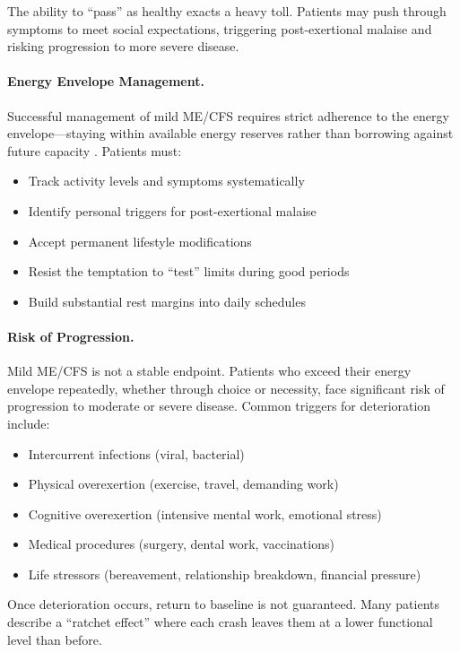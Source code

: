 The ability to ``pass'' as healthy exacts a heavy toll. Patients may push through symptoms to meet social expectations, triggering post-exertional malaise and risking progression to more severe disease.

\paragraph{Energy Envelope Management.}
Successful management of mild ME/CFS requires strict adherence to the energy envelope---staying within available energy reserves rather than borrowing against future capacity \cite{jason2012energy}. Patients must:
\begin{itemize}
    \item Track activity levels and symptoms systematically
    \item Identify personal triggers for post-exertional malaise
    \item Accept permanent lifestyle modifications
    \item Resist the temptation to ``test'' limits during good periods
    \item Build substantial rest margins into daily schedules
\end{itemize}

\paragraph{Risk of Progression.}
Mild ME/CFS is not a stable endpoint. Patients who exceed their energy envelope repeatedly, whether through choice or necessity, face significant risk of progression to moderate or severe disease. Common triggers for deterioration include:
\begin{itemize}
    \item Intercurrent infections (viral, bacterial)
    \item Physical overexertion (exercise, travel, demanding work)
    \item Cognitive overexertion (intensive mental work, emotional stress)
    \item Medical procedures (surgery, dental work, vaccinations)
    \item Life stressors (bereavement, relationship breakdown, financial pressure)
\end{itemize}

Once deterioration occurs, return to baseline is not guaranteed. Many patients describe a ``ratchet effect'' where each crash leaves them at a lower functional level than before.

